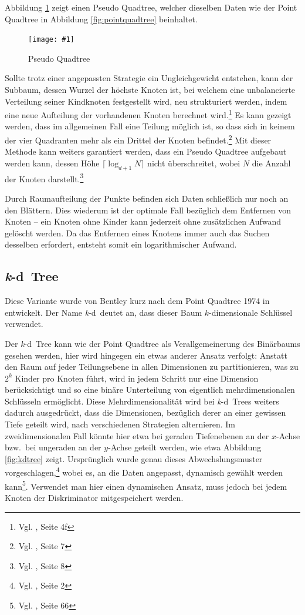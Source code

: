 \documentclass[%
			paper=a4,%
			DIV12,
			liststotoc,
			bibtotoc,
			draft=false,%
			titlepage,
			numbers=noendperiod
			]{scrartcl}
\newcommand{\zit}[3]{#1 \cite{#2}, #3}
\newcommand{\footzit}[3]{\footnote{\zit{#1}{#2}{#3}}}
\newcommand{\kd}{\mbox{\textit{k}-d}}
\newcommand{\myfig}[5] {
 \begin{figure}[tbph]
	 \centering
	 \texttt{[image: \#1]}
	 \caption[#4]{#5}
	 \label{fig:#2}
 \end{figure}
}
\begin{document}
Abbildung \ref{fig:pseudoquadtree} zeigt einen Pseudo Quadtree, welcher dieselben Daten wie der Point Quadtree in Abbildung \ref{fig:pointquadtree} beinhaltet.
\myfig{img/pseudoquadtree-ins3-trimmed}{pseudoquadtree}{width=.6\textwidth}{Pseudo Quadtree}{Pseudo Quadtree}

Sollte trotz einer angepassten Strategie ein Ungleichgewicht entstehen, kann der Subbaum, dessen Wurzel der höchste Knoten ist, bei welchem eine unbalancierte Verteilung seiner Kindknoten festgestellt wird, neu strukturiert werden, indem eine neue Aufteilung der vorhandenen Knoten berechnet wird.\footzit{Vgl.}{DBLP:journals/acta/OvermarsL82}{Seite 4f} %
Es kann gezeigt werden, dass im allgemeinen Fall eine Teilung möglich ist,
so dass sich in keinem der vier Quadranten mehr als ein Drittel der Knoten befindet.\footzit{Vgl.}{DBLP:journals/acta/OvermarsL82}{Seite 7} %
Mit dieser Methode kann weiters garantiert werden, dass ein Pseudo Quadtree aufgebaut werden kann, dessen Höhe $\lceil \log_{d+1} N\rceil$ nicht überschreitet, wobei $N$ die Anzahl der Knoten darstellt.\footzit{Vgl.}{DBLP:journals/acta/OvermarsL82}{Seite 8}

Durch Raumaufteilung der Punkte befinden sich Daten schließlich nur noch an den Blättern. Dies wiederum ist der optimale Fall bezüglich dem Entfernen von Knoten -- ein Knoten ohne Kinder kann jederzeit ohne zusätzlichen Aufwand gelöscht werden. Da das Entfernen eines Knotens immer auch das Suchen desselben erfordert, entsteht somit ein logarithmischer Aufwand.


\subsection{\kd\ Tree}
Diese Variante wurde von Bentley kurz nach dem Point Quadtree 1974 in \cite{Bentley:1975} entwickelt. Der Name \kd\ deutet an, dass dieser Baum $k$-dimensionale Schlüssel verwendet. 

Der \kd\ Tree kann wie der Point Quadtree als Verallgemeinerung des Binärbaums gesehen werden, hier wird hingegen ein etwas anderer Ansatz verfolgt:
Anstatt den Raum auf jeder Teilungsebene in allen Dimensionen zu partitionieren, was zu $2^k$ Kinder pro Knoten führt, wird in jedem Schritt nur eine Dimension berücksichtigt und so eine binäre Unterteilung von eigentlich mehrdimensionalen Schlüsseln ermöglicht.
Diese Mehrdimensionalität wird bei \kd\ Trees weiters dadurch ausgedrückt, dass die Dimensionen, bezüglich derer an einer gewissen Tiefe geteilt wird, nach verschiedenen Strategien alternieren.
Im zweidimensionalen Fall könnte hier etwa bei geraden Tiefenebenen an der $x$-Achse bzw.\ bei ungeraden an der $y$-Achse geteilt werden, wie etwa Abbildung \ref{fig:kdtree} zeigt.
Ursprünglich wurde genau dieses Abwechslungsmuster vorgeschlagen,\footzit{Vgl.}{Bentley:1975}{Seite 2}
wobei es, an die Daten angepasst, dynamisch gewählt werden kann\footzit{Vgl.}{Samet90}{Seite 66}.
Verwendet man hier einen dynamischen Ansatz, muss jedoch bei jedem Knoten der Diskriminator mitgespeichert werden.
\end{document}
